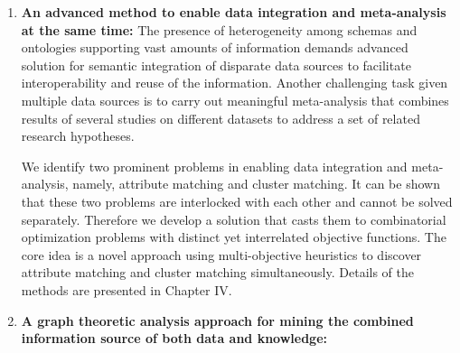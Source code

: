 \begin{enumerate}
\item \textbf{An advanced method to enable data integration and meta-analysis at the same time:}
    The presence of heterogeneity among schemas and ontologies supporting vast amounts of information demands advanced solution for semantic integration of disparate data sources to facilitate interoperability and reuse of the information. Another challenging task given multiple data sources is to carry out meaningful meta-analysis that combines results of several studies on different datasets to address a set of related research hypotheses.

    We identify two prominent problems in enabling data integration and meta-analysis, namely, attribute matching and cluster matching. It can be shown that these two problems are interlocked with each other and cannot be solved separately. Therefore we develop a solution that casts them to combinatorial optimization problems with distinct yet interrelated objective functions. The core idea is a novel approach using multi-objective heuristics to discover attribute matching and cluster matching simultaneously. Details of the methods are presented in Chapter IV.

\item \textbf{A graph theoretic analysis approach for mining the combined information source of both data and knowledge:}



\end{enumerate}
